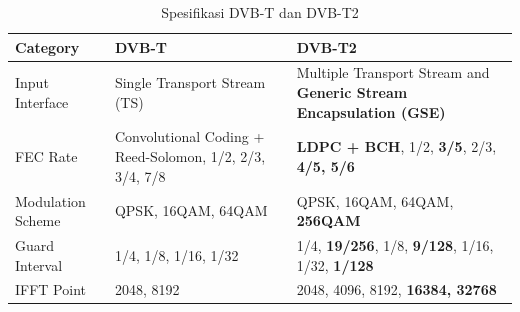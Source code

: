 \begin{singlespace}
\begin{table}[H]
	\centering
	\caption{Spesifikasi DVB-T dan DVB-T2 \citep{Yaacob2019}}
	\label{tabel1}
\begin{tabular}{|p{2cm}|p{5cm}|p{5cm}|}
	\hline
	Category & DVB-T & DVB-T2 \\ \hline
	Input Interface & Single Transport Stream (TS) & Multiple Transport Stream and \textbf{Generic Stream   Encapsulation (GSE)} \\ \hline
	FEC Rate & Convolutional Coding + Reed-Solomon, 1/2, 2/3, 3/4, 7/8 & \textbf{LDPC + BCH}, 1/2, \textbf{3/5}, 2/3, \textbf{4/5, 5/6} \\ \hline
	Modulation Scheme & QPSK, 16QAM, 64QAM & QPSK, 16QAM, 64QAM, \textbf{256QAM} \\ \hline
	Guard Interval & 1/4, 1/8, 1/16, 1/32 & 1/4, \textbf{19/256}, 1/8, \textbf{9/128}, 1/16, 1/32, \textbf{1/128} \\ \hline
	IFFT Point & 2048, 8192 & 2048, 4096, 8192, \textbf{16384, 32768} \\ \hline
	\end{tabular}
\end{table}
\end{singlespace}


